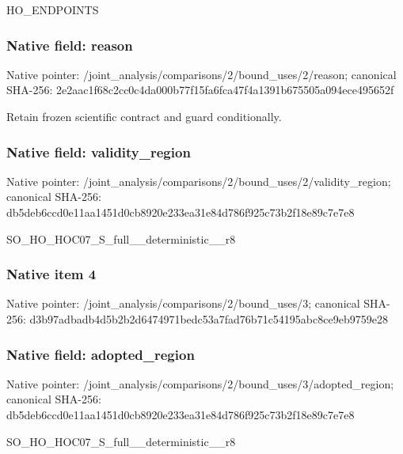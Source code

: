 \documentclass[10pt,a4paper]{article}
\begin{document}
\begingroup\raggedright\sloppy HO\_\allowbreak{}ENDPOINTS\par\endgroup

\subsubsection{Native field: reason}
Native pointer: /joint\_\allowbreak{}analysis/comparisons/2/bound\_\allowbreak{}uses/2/reason; canonical SHA-256: 2e2aac1f68c2cc0c4da000b77f15fa6fca47f4a1391b675505a094ece495652f

\begingroup\raggedright\sloppy Retain frozen scientific contract and guard conditionally.\par\endgroup

\subsubsection{Native field: validity\_\allowbreak{}region}
Native pointer: /joint\_\allowbreak{}analysis/comparisons/2/bound\_\allowbreak{}uses/2/validity\_\allowbreak{}region; canonical SHA-256: db5deb6ccd0e11aa1451d0cb8920e233ea31e84d786f925c73b2f18e89c7e7e8

\begingroup\raggedright\sloppy SO\_\allowbreak{}HO\_\allowbreak{}HOC07\_\allowbreak{}S\_\allowbreak{}full\_\allowbreak{}\_\allowbreak{}deterministic\_\allowbreak{}\_\allowbreak{}r8\par\endgroup

\subsubsection{Native item 4}
Native pointer: /joint\_\allowbreak{}analysis/comparisons/2/bound\_\allowbreak{}uses/3; canonical SHA-256: d3b97adbadb4d5b2b2d6474971bedc53a7fad76b71c54195abc8ce9eb9759e28

\subsubsection{Native field: adopted\_\allowbreak{}region}
Native pointer: /joint\_\allowbreak{}analysis/comparisons/2/bound\_\allowbreak{}uses/3/adopted\_\allowbreak{}region; canonical SHA-256: db5deb6ccd0e11aa1451d0cb8920e233ea31e84d786f925c73b2f18e89c7e7e8

\begingroup\raggedright\sloppy SO\_\allowbreak{}HO\_\allowbreak{}HOC07\_\allowbreak{}S\_\allowbreak{}full\_\allowbreak{}\_\allowbreak{}deterministic\_\allowbreak{}\_\allowbreak{}r8\par\endgroup
\end{document}
